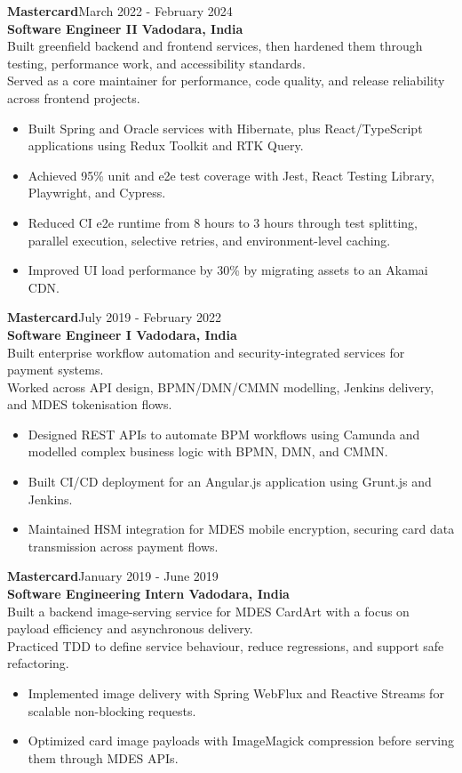 \documentclass[10pt,a4paper]{article}
\newcommand{\resumeSubheading}[4]{%
  \textbf{#1}\hfill #2\\
  \textbf{#3}\hfill #4\\[-5pt]
}
\newcommand{\resumeItem}[1]{\item #1}
\newcommand{\resumeSummaryLine}[1]{#1\\}
\begin{document}
\resumeSubheading{Mastercard}{March 2022 - February 2024}{Software Engineer II \textbar{} Vadodara, India}{}
\resumeSummaryLine{Built greenfield backend and frontend services, then hardened them through testing, performance work, and accessibility standards.}
\resumeSummaryLine{Served as a core maintainer for performance, code quality, and release reliability across frontend projects.}
\begin{itemize}
  \resumeItem{Built Spring and Oracle services with Hibernate, plus React/TypeScript applications using Redux Toolkit and RTK Query.}
  \resumeItem{Achieved 95\% unit and e2e test coverage with Jest, React Testing Library, Playwright, and Cypress.}
  \resumeItem{Reduced CI e2e runtime from 8 hours to 3 hours through test splitting, parallel execution, selective retries, and environment-level caching.}
  \resumeItem{Improved UI load performance by 30\% by migrating assets to an Akamai CDN.}
\end{itemize}

\resumeSubheading{Mastercard}{July 2019 - February 2022}{Software Engineer I \textbar{} Vadodara, India}{}
\resumeSummaryLine{Built enterprise workflow automation and security-integrated services for payment systems.}
\resumeSummaryLine{Worked across API design, BPMN/DMN/CMMN modelling, Jenkins delivery, and MDES tokenisation flows.}
\begin{itemize}
  \resumeItem{Designed REST APIs to automate BPM workflows using Camunda and modelled complex business logic with BPMN, DMN, and CMMN.}
  \resumeItem{Built CI/CD deployment for an Angular.js application using Grunt.js and Jenkins.}
  \resumeItem{Maintained HSM integration for MDES mobile encryption, securing card data transmission across payment flows.}
\end{itemize}

\resumeSubheading{Mastercard}{January 2019 - June 2019}{Software Engineering Intern \textbar{} Vadodara, India}{}
\resumeSummaryLine{Built a backend image-serving service for MDES CardArt with a focus on payload efficiency and asynchronous delivery.}
\resumeSummaryLine{Practiced TDD to define service behaviour, reduce regressions, and support safe refactoring.}
\begin{itemize}
  \resumeItem{Implemented image delivery with Spring WebFlux and Reactive Streams for scalable non-blocking requests.}
  \resumeItem{Optimized card image payloads with ImageMagick compression before serving them through MDES APIs.}
\end{itemize}
\end{document}
